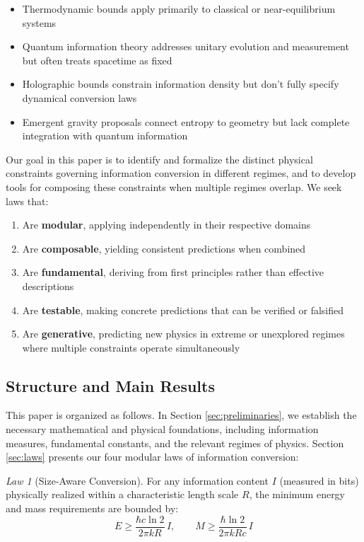 \documentclass[11pt,a4paper]{article}
\theoremstyle{plain}
\theoremstyle{definition}
\theoremstyle{remark}
\newtheorem{law}{Law}
\begin{document}
\begin{itemize}[leftmargin=*]
\item Thermodynamic bounds apply primarily to classical or near-equilibrium systems
\item Quantum information theory addresses unitary evolution and measurement but often treats spacetime as fixed
\item Holographic bounds constrain information density but don't fully specify dynamical conversion laws
\item Emergent gravity proposals connect entropy to geometry but lack complete integration with quantum information
\end{itemize}

Our goal in this paper is to identify and formalize the distinct physical constraints governing information conversion in different regimes, and to develop tools for composing these constraints when multiple regimes overlap. We seek laws that:

\begin{enumerate}[leftmargin=*]
\item Are \textbf{modular}, applying independently in their respective domains
\item Are \textbf{composable}, yielding consistent predictions when combined
\item Are \textbf{fundamental}, deriving from first principles rather than effective descriptions
\item Are \textbf{testable}, making concrete predictions that can be verified or falsified
\item Are \textbf{generative}, predicting new physics in extreme or unexplored regimes where multiple constraints operate simultaneously
\end{enumerate}

\subsection{Structure and Main Results}

This paper is organized as follows. In Section \ref{sec:preliminaries}, we establish the necessary mathematical and physical foundations, including information measures, fundamental constants, and the relevant regimes of physics. Section \ref{sec:laws} presents our four modular laws of information conversion:

\begin{law}[Size-Aware Conversion]
For any information content $I$ (measured in bits) physically realized within a characteristic length scale $R$, the minimum energy and mass requirements are bounded by:
\begin{equation}
E \geq \frac{\hbar c\ln 2}{2\pi k R}\,I, \qquad M \geq \frac{\hbar\ln 2}{2\pi k R c}\,I
\label{eq:law1}
\end{equation}
\end{law}
\end{document}
